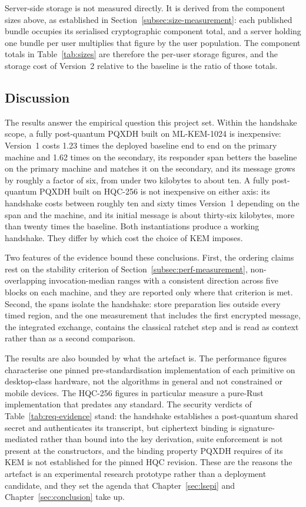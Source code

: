 Server-side storage is not measured directly. It is derived from the component sizes above, as established in Section~\ref{subsec:size-measurement}: each published bundle occupies its serialised cryptographic component total, and a server holding one bundle per user multiplies that figure by the user population. The component totals in Table~\ref{tab:sizes} are therefore the per-user storage figures, and the storage cost of Version~2 relative to the baseline is the ratio of those totals.

\subsection{Discussion}
\label{subsec:discussion}

The results answer the empirical question this project set. Within the handshake scope, a fully post-quantum PQXDH built on ML-KEM-1024 is inexpensive: Version~1 costs 1.23 times the deployed baseline end to end on the primary machine and 1.62 times on the secondary, its responder span betters the baseline on the primary machine and matches it on the secondary, and its message grows by roughly a factor of six, from under two kilobytes to about ten. A fully post-quantum PQXDH built on HQC-256 is not inexpensive on either axis: its handshake costs between roughly ten and sixty times Version~1 depending on the span and the machine, and its initial message is about thirty-six kilobytes, more than twenty times the baseline. Both instantiations produce a working handshake. They differ by which cost the choice of KEM imposes.

Two features of the evidence bound these conclusions. First, the ordering claims rest on the stability criterion of Section~\ref{subsec:perf-measurement}, non-overlapping invocation-median ranges with a consistent direction across five blocks on each machine, and they are reported only where that criterion is met. Second, the spans isolate the handshake: store preparation lies outside every timed region, and the one measurement that includes the first encrypted message, the integrated exchange, contains the classical ratchet step and is read as context rather than as a second comparison.

The results are also bounded by what the artefact is. The performance figures characterise one pinned pre-standardisation implementation of each primitive on desktop-class hardware, not the algorithms in general and not constrained or mobile devices. The HQC-256 figures in particular measure a pure-Rust implementation that predates any standard. The security verdicts of Table~\ref{tab:req-evidence} stand: the handshake establishes a post-quantum shared secret and authenticates its transcript, but ciphertext binding is signature-mediated rather than bound into the key derivation, suite enforcement is not present at the constructors, and the binding property PQXDH requires of its KEM is not established for the pinned HQC revision. These are the reasons the artefact is an experimental research prototype rather than a deployment candidate, and they set the agenda that Chapter~\ref{sec:lsepi} and Chapter~\ref{sec:conclusion} take up.